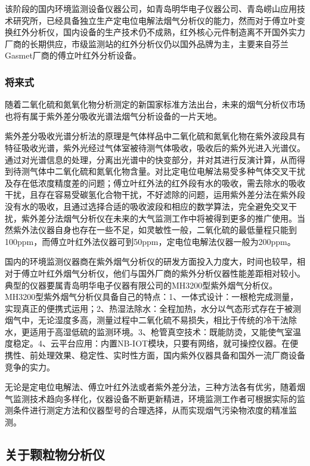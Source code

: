 \documentclass[
]{book}
\begin{document}
该阶段的国内环境监测设备仪器公司，如青岛明华电子仪器公司、青岛崂山应用技术研究所，已经具备独立生产定电位电解法烟气分析仪的能力，然而对于傅立叶变换红外分析仪，国内设备的生产技术仍不成熟，红外核心元件制造离不开国外实力厂商的长期供应，市级监测站的红外分析仪仍以国外品牌为主，主要来自芬兰Gasmet厂商的傅立叶红外分析设备。

\hypertarget{ux5c06ux6765ux5f0f}{%
\subsubsection{将来式}\label{ux5c06ux6765ux5f0f}}

随着二氧化硫和氮氧化物分析测定的新国家标准方法出台，未来的烟气分析仪市场也将有属于紫外差分吸收光谱法烟气分析设备的一片天地。

紫外差分吸收光谱分析法的原理是气体样品中二氧化硫和氮氧化物在紫外波段具有特征吸收光谱，紫外光经过气体室被待测气体吸收，吸收后的紫外光进入光谱仪。通过对光谱信息的处理，分离出光谱中的快变部分，并对其进行反演计算，从而得到待测气体中二氧化硫和氮氧化物含量。对比定电位电解法易受多种气体交叉干扰及存在低浓度精度差的问题；傅立叶红外法的红外段有水的吸收，需去除水的吸收干扰，且存在容易受碳氢化合物干扰，不好滤除的问题，运用紫外差分法在紫外段没有水的吸收，且通过选择合适的吸收波段和相应的数学算法，完全避免交叉干扰，紫外差分法烟气分析仪在未来的大气监测工作中将被得到更多的推广使用。当然紫外法仪器自身也存在一些不足，如灵敏性一般，二氧化硫的最低量程只能到100ppm，而傅立叶红外法仪器可到50ppm，定电位电解法仪器一般为200ppm。

国内的环境监测仪器商在紫外烟气分析仪的研发方面投入力度大，时间也较早，相对于傅立叶红外烟气分析仪，他们与国外厂商的紫外分析仪器性能差距相对较小。典型的仪器要属青岛明华电子仪器有限公司的MH3200型紫外烟气分析仪。MH3200型紫外烟气分析仪具备自己的特点：1、一体式设计：一根枪完成测量，实现真正的便携式运用；2、热湿法除水：全程加热，水分以气态形式存在于被测烟气中，无论湿度多高，测量过程中二氧化硫不易损失，相比于传统的冷干法除水，更适用于高湿低硫的监测环境。3、枪管真空技术：既能防烫，又能使气室温度稳定。4、云平台应用：内置NB-IOT模块，只要有网络，就可操控仪器。在便携性、前处理效果、稳定性、实时性方面，国内紫外仪器具备和国外一流厂商设备竞争的实力。

无论是定电位电解法、傅立叶红外法或者紫外差分法，三种方法各有优劣，随着烟气监测技术趋向多样化，仪器设备不断更新精进，环境监测工作者可根据实际的监测条件进行测定方法和仪器型号的合理选择，从而实现烟气污染物浓度的精准监测。

\hypertarget{ux5173ux4e8eux9897ux7c92ux7269ux5206ux6790ux4eea}{%
\subsection{关于颗粒物分析仪}\label{ux5173ux4e8eux9897ux7c92ux7269ux5206ux6790ux4eea}}
\end{document}
